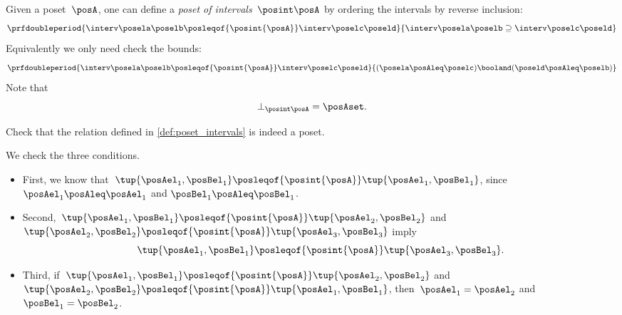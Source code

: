 \begin{definition}
    \label{def:poset_intervals}
    Given a poset~$\posA$, one can define a \emph{poset of intervals}~$\posint\posA$
    by ordering the intervals by reverse inclusion:
    \begin{equation*}
        \prfdoubleperiod{
            \interv \posela \poselb
            \posleqof{\posint{\posA}}
            \interv \poselc \poseld
        }{
            \interv \posela \poselb
            \supseteq
            \interv \poselc \poseld
        }
    \end{equation*}
    Equivalently we only need check the bounds:
    \begin{equation*}
        \prfdoubleperiod{
            \interv \posela \poselb
            \posleqof{\posint{\posA}}
            \interv \poselc \poseld
        }{
            (\posela \posAleq \poselc ) \booland (\poseld \posAleq \poselb)
        }
    \end{equation*}
    Note that
    \begin{equation*}
        \bot_{\posint \posA} = \posAset.
    \end{equation*}
\end{definition}
\begin{exercise}
    Check that the relation defined in \cref{def:poset_intervals} is indeed a poset.
\end{exercise}
\begin{solution}
    We check the three conditions.
    \begin{itemize}
        \item First, we know that~$\tup{\posAel_1,\posBel_1}\posleqof{\posint{\posA}}\tup{\posAel_1,\posBel_1}$, since $\posAel_1\posAleq \posAel_1$ and $\posBel_1\posAleq \posBel_1$.
        \item Second,~$\tup{\posAel_1,\posBel_1}\posleqof{\posint{\posA}}\tup{\posAel_2,\posBel_2}$ and $\tup{\posAel_2,\posBel_2}\posleqof{\posint{\posA}}\tup{\posAel_3,\posBel_3}$ imply
              \begin{equation}
                  \tup{\posAel_1,\posBel_1}\posleqof{\posint{\posA}}\tup{\posAel_3,\posBel_3}.
              \end{equation}
        \item Third, if~$\tup{\posAel_1,\posBel_1}\posleqof{\posint{\posA}}\tup{\posAel_2,\posBel_2}$ and $\tup{\posAel_2,\posBel_2}\posleqof{\posint{\posA}}\tup{\posAel_1,\posBel_1}$, then~$\posAel_1=\posAel_2$ and~$\posBel_1=\posBel_2$.
    \end{itemize}
\end{solution}
\vfill
\clearpage
